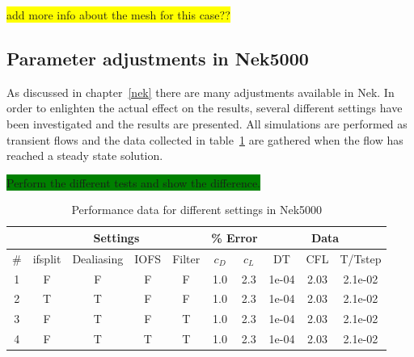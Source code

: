 \colorbox{yellow}{add more info about the mesh for this case??}

\subsection{Parameter adjustments in Nek5000}
As discussed in chapter~\ref{nek} there are many adjustments available in Nek. 
In order to enlighten the actual effect on the results, several different settings have 
been investigated and the results are presented. All simulations are performed as 
transient flows and the data collected in table~\ref{tab:perf} are gathered when the 
flow has reached a steady state solution. 

\colorbox{green}{Perform the different tests and show the difference.}

\begin{table}[h]
    \centering
    \begin{tabular}{c | c c c c | c c | c c c}

         & \multicolumn{4}{|c|}{Settings} & \multicolumn{2}{|c|}{\% Error} & \multicolumn{3}{|c}{Data} \\\hline
         \#  & ifsplit & Dealiasing & IOFS & Filter & $c_D$ & $c_L$ & DT & CFL & T/Tstep \\ \hline 
         1 & F & F & F & F & 1.0 & 2.3 & 1e-04 & 2.03 & 2.1e-02 \\
         2 & T & T & F & F & 1.0 & 2.3 & 1e-04 & 2.03 & 2.1e-02 \\
         3 & F & T & F & T & 1.0 & 2.3 & 1e-04 & 2.03 & 2.1e-02 \\
         4 & F & T & T & T & 1.0 & 2.3 & 1e-04 & 2.03 & 2.1e-02 \\
    \end{tabular}
    \caption{Performance data for different settings in Nek5000}
    \label{tab:perf}
\end{table}
